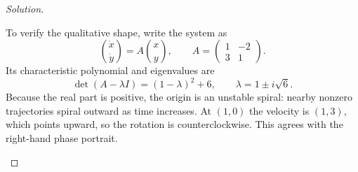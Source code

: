 \documentclass[12pt]{amsart}
\theoremstyle{conjecture}
\theoremstyle{definition}
\theoremstyle{question}
\theoremstyle{theorem}
\newenvironment{solution}
{\begin{proof}[Solution]}
{\end{proof}}
\begin{document}
\begin{solution}
\begin{enumerate}
            To verify the qualitative shape, write the system as
            \[
                \binom{\dot x}{\dot y}
                =A\binom{x}{y},
                \qquad
                A=\begin{pmatrix}1&-2\\3&1\end{pmatrix}.
            \]
            Its characteristic polynomial and eigenvalues are
            \[
                \det(A-\lambda I)=(1-\lambda)^2+6,
                \qquad \lambda=1\pm i\sqrt6.
            \]
            Because the real part is positive, the origin is an unstable spiral: nearby
            nonzero trajectories spiral outward as time increases. At $(1,0)$ the
            velocity is $(1,3)$, which points upward, so the rotation is
            counterclockwise. This agrees with the right-hand phase portrait.
        \end{enumerate}
    \end{solution}
\end{document}
